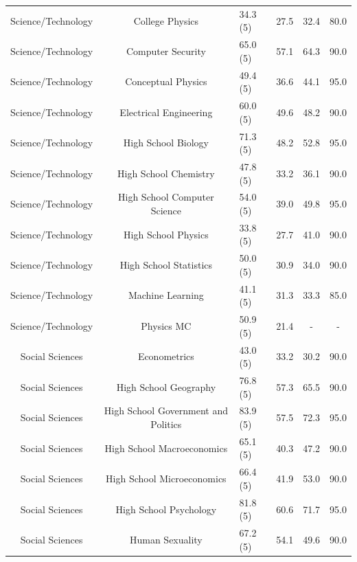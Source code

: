 \documentclass[11pt, a4paper, logo, internal, copyright, nonumbering]{deepmind}
\begin{document}
\begin{center}
\begin{longtable}{cclccc}
     Science/Technology &                      College Physics &   34.3 (5) &  27.5 &  32.4 &         80.0 \\
     Science/Technology &                    Computer Security &   65.0 (5) &  57.1 &  64.3 &         90.0 \\
     Science/Technology &                   Conceptual Physics &   49.4 (5) &  36.6 &  44.1 &         95.0 \\
     Science/Technology &               Electrical Engineering &   60.0 (5) &  49.6 &  48.2 &         90.0 \\
     Science/Technology &                  High School Biology &   71.3 (5) &  48.2 &  52.8 &         95.0 \\
     Science/Technology &                High School Chemistry &   47.8 (5) &  33.2 &  36.1 &         90.0 \\
     Science/Technology &         High School Computer Science &   54.0 (5) &  39.0 &  49.8 &         95.0 \\
     Science/Technology &                  High School Physics &   33.8 (5) &  27.7 &  41.0 &         90.0 \\
     Science/Technology &               High School Statistics &   50.0 (5) &  30.9 &  34.0 &         90.0 \\
     Science/Technology &                     Machine Learning &   41.1 (5) &  31.3 &  33.3 &         85.0 \\
     Science/Technology &                            Physics MC &   50.9 (5) &  21.4 &   - &          - \\
        Social Sciences &                         Econometrics &   43.0 (5) &  33.2 &  30.2 &         90.0 \\
        Social Sciences &                High School Geography &   76.8 (5) &  57.3 &  65.5 &         90.0 \\
        Social Sciences &  High School Government and Politics &   83.9 (5) &  57.5 &  72.3 &         95.0 \\
        Social Sciences &           High School Macroeconomics &   65.1 (5) &  40.3 &  47.2 &         90.0 \\
        Social Sciences &           High School Microeconomics &   66.4 (5) &  41.9 &  53.0 &         90.0 \\
        Social Sciences &               High School Psychology &   81.8 (5) &  60.6 &  71.7 &         95.0 \\
        Social Sciences &                      Human Sexuality &   67.2 (5) &  54.1 &  49.6 &         90.0 \\

\end{longtable}
\end{center}
\end{document}
